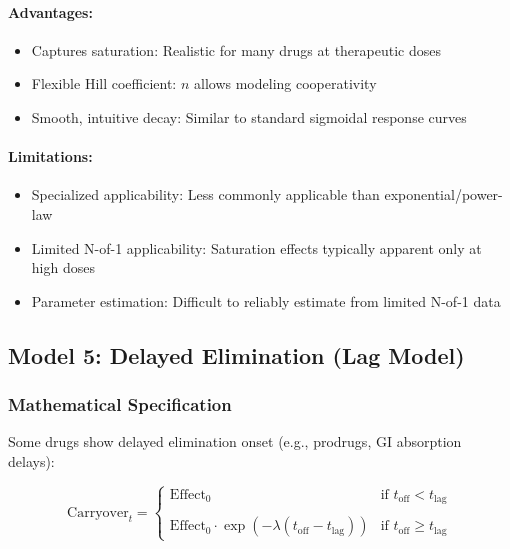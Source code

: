 \documentclass[11pt,a4paper]{article}
\begin{document}
\paragraph{Advantages:}
\begin{itemize}
  \item Captures saturation: Realistic for many drugs at therapeutic doses
  \item Flexible Hill coefficient: $n$ allows modeling cooperativity
  \item Smooth, intuitive decay: Similar to standard sigmoidal response curves
\end{itemize}

\paragraph{Limitations:}
\begin{itemize}
  \item Specialized applicability: Less commonly applicable than exponential/power-law
  \item Limited N-of-1 applicability: Saturation effects typically apparent only at high doses
  \item Parameter estimation: Difficult to reliably estimate from limited N-of-1 data
\end{itemize}

\subsection{Model 5: Delayed Elimination (Lag Model)}
\label{subsec:lagmodel}

\subsubsection{Mathematical Specification}

Some drugs show delayed elimination onset (e.g., prodrugs, GI absorption delays):

\begin{equation}
  \text{Carryover}_t = \begin{cases}
    \text{Effect}_0 & \text{if } t_{\text{off}} < t_{\text{lag}} \\
    \\
    \text{Effect}_0 \cdot \exp(-\lambda(t_{\text{off}} - t_{\text{lag}})) & \text{if } t_{\text{off}} \geq t_{\text{lag}}
  \end{cases}
\end{equation}
\end{document}
